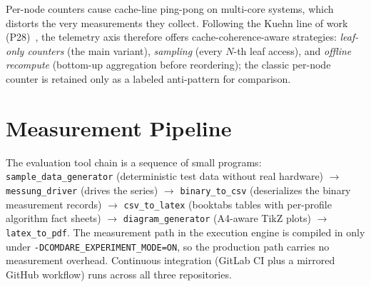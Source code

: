 Per-node counters cause cache-line ping-pong on multi-core systems, which distorts the very
measurements they collect. Following the Kuehn line of work (P28)~\cite{kuehn2023bplustree}, the
telemetry axis therefore offers cache-coherence-aware strategies: \emph{leaf-only counters} (the
main variant), \emph{sampling} (every $N$-th leaf access), and \emph{offline recompute} (bottom-up
aggregation before reordering); the classic per-node counter is retained only as a labeled
anti-pattern for comparison.

\section{Measurement Pipeline}\label{sec:pipeline}

The evaluation tool chain is a sequence of small programs: \texttt{sample\_data\_generator}
(deterministic test data without real hardware) $\rightarrow$ \texttt{messung\_driver} (drives the
series) $\rightarrow$ \texttt{binary\_to\_csv} (deserializes the binary measurement records)
$\rightarrow$ \texttt{csv\_to\_latex} (booktabs tables with per-profile algorithm fact sheets)
$\rightarrow$ \texttt{diagram\_generator} (A4-aware TikZ plots) $\rightarrow$
\texttt{latex\_to\_pdf}. The measurement path in the execution engine is compiled in only under
\texttt{-DCOMDARE\_\allowbreak{}EXPERIMENT\_\allowbreak{}MODE=ON}, so the production path carries no
measurement overhead. Continuous integration (GitLab CI plus a mirrored GitHub workflow) runs across
all three repositories.
